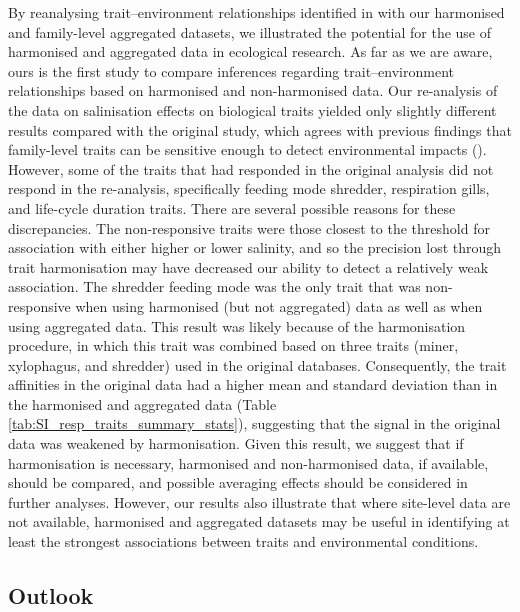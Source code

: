 \documentclass[12pt]{article}
\begin{document}
By reanalysing trait–environment relationships identified in \citet{szocs_effects_2014} with our harmonised and family-level aggregated datasets, we illustrated the potential for the use of harmonised and aggregated data in ecological research. As far as we are aware, ours is the first study to compare inferences regarding trait–environment relationships based on harmonised and non-harmonised data. Our re-analysis of the data on salinisation effects on biological traits yielded only slightly different results compared with the original study, which agrees with previous findings that family-level traits can be sensitive enough to detect environmental impacts (\cite{beketov_spear_2009}). However, some of the traits that had responded in the original analysis did not respond in the re-analysis, specifically feeding mode shredder, respiration gills, and life-cycle duration traits. There are several possible reasons for these discrepancies. The non-responsive traits were those closest to the threshold for association with either higher or lower salinity, and so the precision lost through trait harmonisation may have decreased our ability to detect a relatively weak association. The shredder feeding mode was the only trait that was non-responsive when using harmonised (but not aggregated) data as well as when using aggregated data. This result was likely because of the harmonisation procedure, in which this trait was combined based on three traits (miner, xylophagus, and shredder) used in the original databases. Consequently, the trait affinities in the original data had a higher mean and standard deviation than in the harmonised and aggregated data (Table \ref{tab:SI_resp_traits_summary_stats}), suggesting that the signal in the original data was weakened by harmonisation. Given this result, we suggest that if harmonisation is necessary, harmonised and non-harmonised data, if available, should be compared, and possible averaging effects should be considered in further analyses. However, our results also illustrate that where site-level data are not available, harmonised and aggregated datasets may be useful in identifying at least the strongest associations between traits and environmental conditions. 


\subsection*{Outlook}
\end{document}
